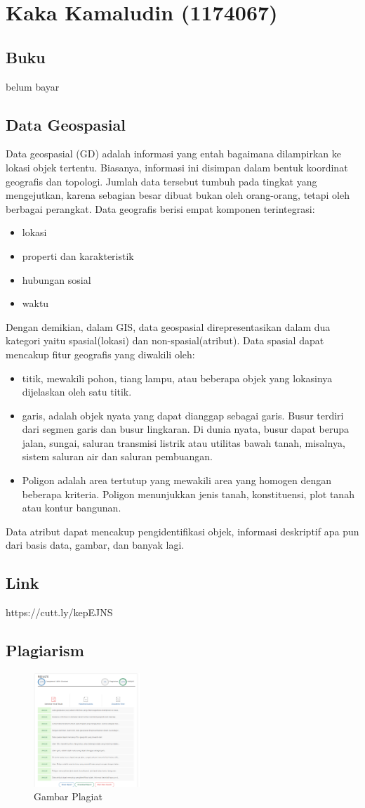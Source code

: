 \section{Kaka Kamaludin (1174067)}
\subsection{Buku}
belum bayar
\subsection{Data Geospasial}
Data geospasial (GD) adalah informasi yang entah bagaimana dilampirkan ke lokasi objek tertentu. Biasanya, informasi ini disimpan dalam bentuk koordinat geografis dan topologi. Jumlah data tersebut tumbuh pada tingkat yang mengejutkan, karena sebagian besar dibuat bukan oleh orang-orang, tetapi oleh berbagai perangkat.
Data geografis berisi empat komponen terintegrasi:
\begin{itemize}
	\item lokasi
	\item properti dan karakteristik
	\item hubungan sosial
	\item waktu
\end{itemize}
Dengan demikian, dalam GIS, data geospasial direpresentasikan dalam dua kategori yaitu spasial(lokasi) dan non-spasial(atribut). Data spasial dapat mencakup fitur geografis yang diwakili oleh:
\begin{itemize}
 	\item titik, mewakili pohon, tiang lampu, atau beberapa objek yang lokasinya dijelaskan oleh satu titik.
 	\item garis,  adalah objek nyata yang dapat dianggap sebagai garis. Busur terdiri dari segmen garis dan busur lingkaran. Di dunia nyata, busur dapat berupa jalan, sungai, saluran transmisi listrik atau utilitas bawah tanah, misalnya, sistem saluran air dan saluran pembuangan.
 	\item Poligon adalah area tertutup yang mewakili area yang homogen dengan beberapa kriteria. Poligon menunjukkan jenis tanah, konstituensi, plot tanah atau kontur bangunan.
\end{itemize}
Data atribut dapat mencakup pengidentifikasi objek, informasi deskriptif apa pun dari basis data, gambar, dan banyak lagi.
\subsection{Link}
https://cutt.ly/kepEJNS
\subsection{Plagiarism}
\begin{figure}[H]
	\includegraphics[width=4cm]{figures/Tugas1/1174067/plagiat.png}
	\centering
	\caption{Gambar Plagiat}
\end{figure}